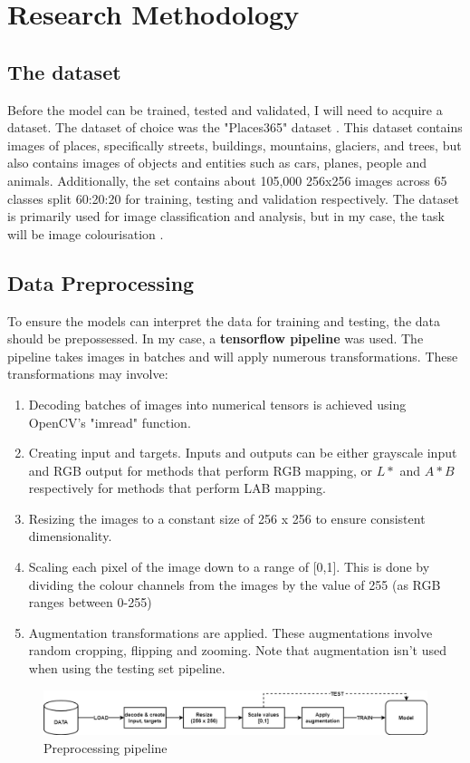 

\chapter{Research Methodology}
\section{The dataset}
Before the model can be trained, tested and validated, I will need to acquire a dataset. The dataset of choice was the "Places365" dataset \cite{DBLP:journals/corr/ZhouKLTO16}. This dataset contains images of places, specifically streets, buildings, mountains, glaciers, and trees, but also contains images of objects and entities such as cars, planes, people and animals. Additionally, the set contains about 105,000 256x256 images across 65 classes split 60:20:20 for training, testing and validation respectively. The dataset is primarily used for image classification and analysis, but in my case, the task will be image colourisation \cite{landscape}.
\section{Data Preprocessing}
To ensure the models can interpret the data for training and testing, the data should be prepossessed. In my case, a \textbf{tensorflow pipeline} was used. The pipeline takes images in batches and will apply numerous transformations. These transformations may involve:  

\begin{enumerate}
  \item Decoding batches of images into numerical tensors is achieved using OpenCV's "imread" function.
  \item Creating input and targets. Inputs and outputs can be either grayscale input and RGB output for methods that perform RGB mapping, or \(L*\) and \(A*B\) respectively for methods that perform LAB mapping.
  \item Resizing the images to a constant size of 256 x 256 to ensure consistent dimensionality.
  \item Scaling each pixel of the image down to a range of [0,1]. This is done by dividing the colour channels from the images by the value of 255 (as RGB ranges between 0-255)
  \item Augmentation transformations are applied. These augmentations involve random cropping, flipping and zooming. Note that augmentation isn't used when using the testing set pipeline.
\end{enumerate}
\begin{figure}[H]
    \centering
    \includegraphics[width=1\columnwidth]{sections/figures/pipeline.png}
    \caption{Preprocessing pipeline}
    \label{fig:my_label}
\end{figure}






